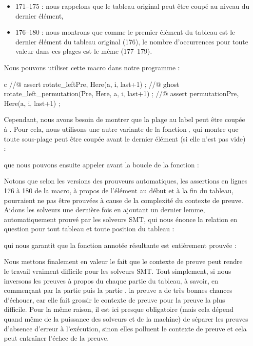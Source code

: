 \begin{itemize}
    \item 171--175 : nous rappelons que le tableau original peut être coupé au
          niveau du dernier élément,
    \item 176--180 : nous montrons que comme le premier élément du tableau est le
          dernier élément du tableau original (176), le nombre d'occurrences pour
          toute valeur dans ces plages est le même (177--179).
\end{itemize}


Nous pouvons utiliser cette macro dans notre programme :


\begin{CodeBlock}{c}
//@ assert rotate_left{Pre, Here}(a, i, last+1) ;
//@ ghost rotate_left_permutation(Pre, Here, a, i, last+1) ;
//@ assert permutation{Pre, Here}(a, i, last+1) ;
\end{CodeBlock}


Cependant, nous avons besoin de montrer que la plage au label  peut
être coupée à  . Pour cela, nous utilisons une autre variante de la
fonction , qui montre que toute sous-plage peut être coupée avant
le dernier élément (si elle n'est pas vide) :




que nous pouvons ensuite appeler avant la boucle de la fonction  :




Notons que selon les versions des prouveurs automatiques, les assertions en lignes
176 à 180 de la macro, à propos de l'élément au début et à la fin du tableau,
pourraient ne pas être prouvées à cause de la complexité du contexte de preuve.
Aidons les solveurs une dernière fois en ajoutant un dernier lemme, automatiquement
prouvé par les solveurs SMT, qui nous énonce la relation en question pour tout
tableau et toute position du tableau :




qui nous garantit que la fonction annotée résultante est entièrement prouvée :




Nous mettons finalement en valeur le fait que le contexte de preuve peut rendre
le travail vraiment difficile pour les solveurs SMT. Tout simplement, si nous
inversons les preuves à propos du chaque partie du tableau, à savoir, en
commençant par la partie  puis la partie ,
la preuve a de très bonnes chances d'échouer, car elle fait grossir le contexte de
preuve pour la preuve la plus difficile. Pour la même raison, il est ici presque
obligatoire (mais cela dépend quand même de la puissance des solveurs et de la
machine) de séparer les preuves d'absence d'erreur à l'exécution, sinon elles
polluent le contexte de preuve et cela peut entraîner l'échec de la preuve.


